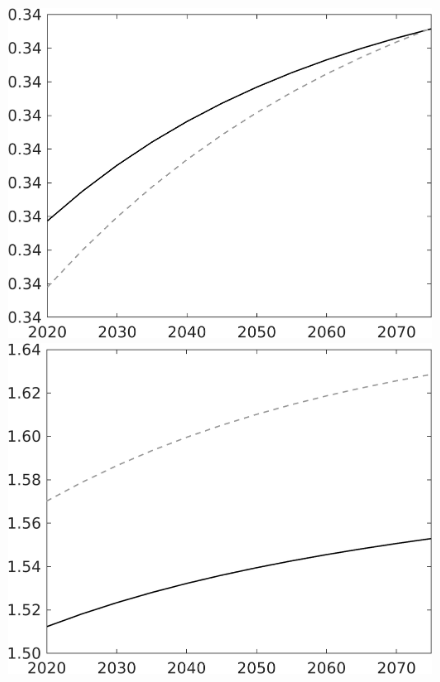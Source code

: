 \documentclass[12pt]{article}
\begin{document}
\begin{figure}
\begin{minipage}[]{0.32\textwidth}
	\end{minipage}		
	\begin{minipage}[]{0.32\textwidth}
		\includegraphics[width=1\textwidth]{../../codding_model/own_basedOnFried/optimalPol_010922_revision/figures/all_13Sept22/LevTaufNoTauf_TaulCalib_regime0_Ln_spillover0_nsk1_xgr0_knspil1_sep1_LFlimit0_emsbase0_countec0_GovRev0_etaa0.79_lgd0.png}
	\end{minipage}		
	\begin{minipage}[]{0.32\textwidth}
		\includegraphics[width=1\textwidth]{../../codding_model/own_basedOnFried/optimalPol_010922_revision/figures/all_13Sept22/LevTaufNoTauf_TaulCalib_regime0_pn_spillover0_nsk1_xgr0_knspil1_sep1_LFlimit0_emsbase0_countec0_GovRev0_etaa0.79_lgd0.png}

\end{minipage}
\end{figure}
\end{document}
